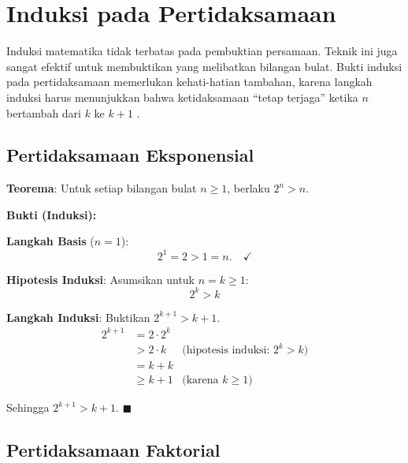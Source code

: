 \section{Induksi pada Pertidaksamaan}

Induksi matematika tidak terbatas pada pembuktian persamaan. Teknik ini juga sangat efektif untuk membuktikan  yang melibatkan bilangan bulat. Bukti induksi pada pertidaksamaan memerlukan kehati-hatian tambahan, karena langkah induksi harus menunjukkan bahwa ketidaksamaan ``tetap terjaga'' ketika $n$ bertambah dari $k$ ke $k+1$ \cite{rosen2019}.

\subsection{Pertidaksamaan Eksponensial}

\begin{contoh}
\textbf{Teorema}: Untuk setiap bilangan bulat $n \geq 1$, berlaku $2^n > n$.

\textbf{Bukti (Induksi):}

\textbf{Langkah Basis} ($n = 1$):
\[ 2^1 = 2 > 1 = n. \quad \checkmark \]

\textbf{Hipotesis Induksi}: Asumsikan untuk $n = k \geq 1$:
\[ 2^k > k \]

\textbf{Langkah Induksi}: Buktikan $2^{k+1} > k + 1$.
\begin{align*}
2^{k+1} &= 2 \cdot 2^k \\
         &> 2 \cdot k  & \text{(hipotesis induksi: } 2^k > k) \\
         &= k + k \\
         &\geq k + 1 & \text{(karena } k \geq 1)
\end{align*}

Sehingga $2^{k+1} > k + 1$. $\blacksquare$
\end{contoh}

\subsection{Pertidaksamaan Faktorial}

